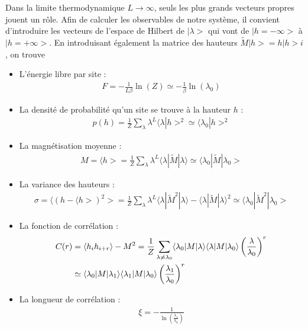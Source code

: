 Dans la limite thermodynamique $L \to \infty$, seuls les plus grands vecteurs propres jouent un rôle. Afin de calculer les observables de notre système, il convient d'introduire les vecteurs de l'espace de Hilbert de ${|\lambda>}$ qui vont de $|h = -\infty>$ à $|h = +\infty>$.
En introduisant également la matrice des hauteurs $\tilde{M} |h> = h |h> i$, on trouve
\begin{itemize}
	\item L'énergie libre par site :  
	\begin{align}
		F =  - \frac{1}{L \beta} \ln(Z) \simeq - \frac{1}{\beta } \ln( \lambda_0)
		\label{energie-libre-site}
	\end{align}
	\item La densité de probabilité qu'un site se trouve à la hauteur $h$ :
	\begin{align}
		p(h) = \frac{1}{Z} \sum_\lambda \lambda^L \langle\lambda | h >^2 \simeq \langle \lambda_0 | h >^2
	\end{align}
	\item La magnétisation moyenne :
	\begin{align}
		M = \langle h > = \frac{1}{Z} \sum_\lambda \lambda^L \langle \lambda | \tilde{M} | \lambda \rangle \simeq \langle \lambda_0 | \tilde{M} | \lambda_0 > 
		\label{tm-magnetisation}
	\end{align}
	\item La variance des hauteurs :
	\begin{align}
		\sigma = \langle (h - \langle h >)^2 > = \frac{1}{Z} \sum_\lambda \lambda^L \langle \lambda | \tilde{M}^2 | \lambda \rangle - \langle \lambda | \tilde{M}| \lambda \rangle^2  \simeq  \langle \lambda_0 | \tilde{M}^2 | \lambda_0 >
	\end{align}
	\item La fonction de corrélation :
	\begin{align}
	    C(r) &= \langle h_i h_{i+r} \rangle - M^2 = \frac{1}{Z} \sum_{\lambda \neq \lambda_0} \langle \lambda_0 | M | \lambda \rangle \langle \lambda | M | \lambda_0 \rangle \left( \frac{\lambda}{\lambda_0} \right)^r  
	    \nonumber \\
	    &\simeq \langle \lambda_0 | M | \lambda_1 \rangle \langle \lambda_1 | M | \lambda_0 \rangle \left( \frac{\lambda_1}{\lambda_0} \right)^r
	\end{align}
	\item La longueur de corrélation :
	\begin{align}
	    \xi = - \frac{1}{\ln(\frac{\lambda_1}{\lambda_0})}
	    \label{longueur-correl-thermo}
	\end{align}
\end{itemize}


